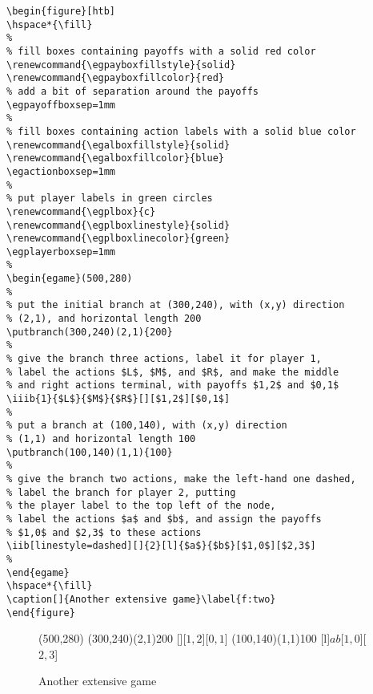 \documentclass[12pt]{article}
\begin{document}

\begin{verbatim}
\begin{figure}[htb]
\hspace*{\fill}
%
% fill boxes containing payoffs with a solid red color
\renewcommand{\egpayboxfillstyle}{solid}
\renewcommand{\egpayboxfillcolor}{red}
% add a bit of separation around the payoffs
\egpayoffboxsep=1mm
%
% fill boxes containing action labels with a solid blue color
\renewcommand{\egalboxfillstyle}{solid}
\renewcommand{\egalboxfillcolor}{blue}
\egactionboxsep=1mm
%
% put player labels in green circles
\renewcommand{\egplbox}{c}
\renewcommand{\egplboxlinestyle}{solid}
\renewcommand{\egplboxlinecolor}{green}
\egplayerboxsep=1mm
%
\begin{egame}(500,280)
%
% put the initial branch at (300,240), with (x,y) direction
% (2,1), and horizontal length 200
\putbranch(300,240)(2,1){200}
%
% give the branch three actions, label it for player 1,
% label the actions $L$, $M$, and $R$, and make the middle
% and right actions terminal, with payoffs $1,2$ and $0,1$
\iiib{1}{$L$}{$M$}{$R$}[][$1,2$][$0,1$]
%
% put a branch at (100,140), with (x,y) direction
% (1,1) and horizontal length 100
\putbranch(100,140)(1,1){100}
%
% give the branch two actions, make the left-hand one dashed,
% label the branch for player 2, putting
% the player label to the top left of the node,
% label the actions $a$ and $b$, and assign the payoffs
% $1,0$ and $2,3$ to these actions
\iib[linestyle=dashed][]{2}[l]{$a$}{$b$}[$1,0$][$2,3$]
%
\end{egame}
\hspace*{\fill}
\caption[]{Another extensive game}\label{f:two}
\end{figure}
\end{verbatim}

\begin{figure}[htb]
\hspace*{\fill}
\renewcommand{\egpayboxfillstyle}{solid}
\renewcommand{\egpayboxfillcolor}{red}
\egpayoffboxsep=1mm
\renewcommand{\egalboxfillstyle}{solid}
\renewcommand{\egalboxfillcolor}{blue}
\egactionboxsep=1mm
\renewcommand{\egplbox}{c}
\renewcommand{\egplboxlinestyle}{solid}
\renewcommand{\egplboxlinecolor}{green}
\egplayerboxsep=1mm
\begin{egame}(500,280)
%
\putbranch(300,240)(2,1){200}
%
[][$1,2$][$0,1$]
%
\putbranch(100,140)(1,1){100}
%
[l]{$a$}{$b$}[$1,0$][$2,3$]
%
\end{egame}
\hspace*{\fill}
\caption[]{Another extensive game}\label{f:two}
\end{figure}
\end{document}

